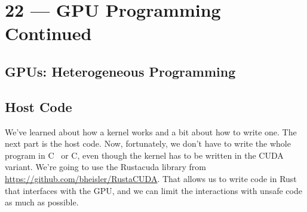 \documentclass[a4paper]{report}
\newcommand{\CPP}{C\nolinebreak\hspace{-.05em}\raisebox{.4ex}{\tiny\bf +}\nolinebreak\hspace{-.10em}\raisebox{.4ex}{\tiny\bf +}}
\def\CPP{{C\nolinebreak[4]\hspace{-.05em}\raisebox{.4ex}{\tiny\bf ++}}}
\begin{document}
\chapter*{22 --- GPU Programming Continued}


\section*{GPUs: Heterogeneous Programming}

\section*{Host Code}
We've learned about how a kernel works and a bit about how to write one. The next part is the host code. Now, fortunately, we don't have to write the whole program in \CPP~ or C, even though the kernel has to be written in the CUDA variant. We're going to use the Rustacuda library from \url{https://github.com/bheisler/RustaCUDA}. That allows us to write code in Rust that interfaces with the GPU, and we can limit the interactions with unsafe code as much as possible.
 
\end{document}
